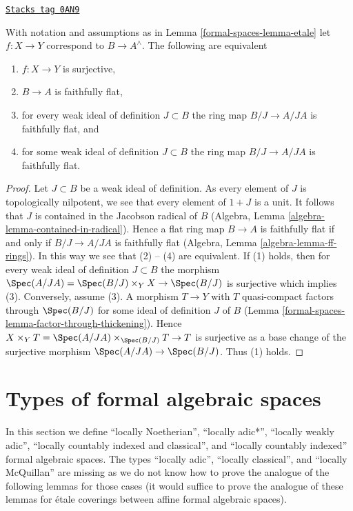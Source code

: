 \begin{lemma}
\label{formal-spaces-lemma-etale-surjective}
\href{https://stacks.math.columbia.edu/tag/0AN9}{\texttt{Stacks tag 0AN9}}

With notation and assumptions as in Lemma \ref{formal-spaces-lemma-etale} let
$f : X \to Y$ correspond to $B \to A^\wedge$. The following are equivalent
\begin{enumerate}
\item $f : X \to Y$ is surjective,
\item $B \to A$ is faithfully flat,
\item for every weak ideal of definition $J \subset B$
the ring map $B/J \to A/JA$ is faithfully flat, and
\item for some weak ideal of definition $J \subset B$
the ring map $B/J \to A/JA$ is faithfully flat.
\end{enumerate}
\end{lemma}

\begin{proof}
Let $J \subset B$ be a weak ideal of definition. As every element of $J$
is topologically nilpotent, we see that every element of $1 + J$ is
a unit. It follows that $J$ is contained in the Jacobson radical of $B$
(Algebra, Lemma \ref{algebra-lemma-contained-in-radical}).
Hence a flat ring map $B \to A$ is faithfully flat if and only if
$B/J \to A/JA$ is faithfully flat
(Algebra, Lemma \ref{algebra-lemma-ff-rings}).
In this way we see that (2) -- (4) are equivalent.
If (1) holds, then for every weak ideal of definition $J \subset B$
the morphism
$\Spec(A/JA) = \Spec(B/J) \times_Y X \to \Spec(B/J)$ is surjective
which implies (3). Conversely, assume (3).
A morphism $T \to Y$ with $T$ quasi-compact
factors through $\Spec(B/J)$ for some ideal of definition $J$ of $B$
(Lemma \ref{formal-spaces-lemma-factor-through-thickening}).
Hence $X \times_Y T = \Spec(A/JA) \times_{\Spec(B/J)} T \to T$
is surjective as a base change of the surjective morphism
$\Spec(A/JA) \to \Spec(B/J)$. Thus (1) holds.
\end{proof}

\section{Types of formal algebraic spaces}
\label{formal-spaces-section-types}
In this section we define
``locally Noetherian'',
``locally adic*'',
``locally weakly adic'',
``locally countably indexed and classical'', and
``locally countably indexed''
formal algebraic spaces. The types
``locally adic'',
``locally classical'', and
``locally McQuillan''
are missing as we do not know how to prove the analogue of the following
lemmas for those cases (it would suffice to prove the analogue of these
lemmas for \'etale coverings between affine formal algebraic spaces).


